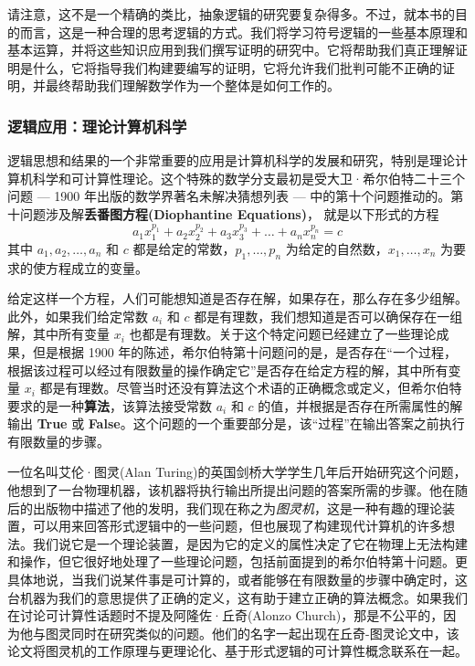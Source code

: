 请注意，这不是一个精确的类比，抽象逻辑的研究要复杂得多。不过，就本书的目的而言，这是一种合理的思考逻辑的方式。我们将学习符号逻辑的一些基本原理和基本运算，并将这些知识应用到我们撰写证明的研究中。它将帮助我们真正理解证明是什么，它将指导我们构建要编写的证明，它将允许我们批判可能不正确的证明，并最终帮助我们理解数学作为一个整体是如何工作的。

\subsubsection*{逻辑应用：理论计算机科学}

逻辑思想和结果的一个非常重要的应用是计算机科学的发展和研究，特别是理论计算机科学和可计算性理论。这个特殊的数学分支最初是受大卫·希尔伯特二十三个问题 --- 1900 年出版的数学界著名未解决猜想列表 --- 中的第十个问题推动的。第十问题涉及解\textbf{丢番图方程(Diophantine Equations)}， 就是以下形式的方程
\[a_1x_1^{p_1}+a_2x_2^{p_2}+a_3x_3^{p_3}+\dots+a_nx_n^{p_n} = c\]
其中 $a_1, a_2, \dots, a_n$ 和 $c$ 都是给定的常数，$p_1, \dots, p_n$ 为给定的自然数，$x_1, \dots, x_n$ 为要求的使方程成立的变量。

给定这样一个方程，人们可能想知道是否存在解，如果存在，那么存在多少组解。 此外，如果我们给定常数 $a_i$ 和 $c$ 都是有理数，我们想知道是否可以确保存在一组解，其中所有变量 $x_i$ 也都是有理数。关于这个特定问题已经建立了一些理论成果，但是根据 1900 年的陈述，希尔伯特第十问题问的是，是否存在“一个过程，根据该过程可以经过有限数量的操作确定它”是否存在给定方程的解，其中所有变量 $x_i$ 都是有理数。尽管当时还没有算法这个术语的正确概念或定义，但希尔伯特要求的是一种\textbf{算法}，该算法接受常数 $a_i$ 和 $c$ 的值，并根据是否存在所需属性的解输出 \textbf{True} 或 \textbf{False}。这个问题的一个重要部分是，该“过程”在输出答案之前执行有限数量的步骤。

一位名叫艾伦·图灵(Alan Turing)的英国剑桥大学学生几年后开始研究这个问题，他想到了一台物理机器，该机器将执行输出所提出问题的答案所需的步骤。他在随后的出版物中描述了他的发明，我们现在称之为\textit{图灵机}，这是一种有趣的理论装置，可以用来回答形式逻辑中的一些问题，但也展现了构建现代计算机的许多想法。我们说它是一个理论装置，是因为它的定义的属性决定了它在物理上无法构建和操作，但它很好地处理了一些理论问题，包括前面提到的希尔伯特第十问题。更具体地说，当我们说某件事是可计算的，或者能够在有限数量的步骤中确定时，这台机器为我们的意思提供了正确的定义，这有助于建立正确的算法概念。如果我们在讨论可计算性话题时不提及阿隆佐·丘奇(Alonzo Church)，那是不公平的，因为他与图灵同时在研究类似的问题。他们的名字一起出现在丘奇-图灵论文中，该论文将图灵机的工作原理与更理论化、基于形式逻辑的可计算性概念联系在一起。

